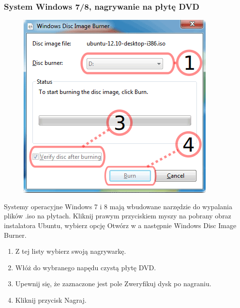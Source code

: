 \subsubsection{System Windows 7/8, nagrywanie na płytę DVD}
\begin{figure}
	\vspace{-10pt}
	\includegraphics[width=\linewidth]{images/instalacja_nagrywanie_obrazu_DVD.png}
\end{figure}

Systemy operacyjne Windows 7 i 8 mają wbudowane narzędzie do wypalania plików .iso na płytach. Kliknij prawym przyciskiem myszy na pobrany obraz instalatora Ubuntu, wybierz opcję \textcolor{ubuntu_orange}{Otwórz w} a następnie \textcolor{ubuntu_orange}{Windows Disc Image Burner}.
\begin{enumerate}[label=\protect\circled{\arabic*}]
\item Z tej listy wybierz swoją nagrywarkę.
\item Włóż do wybranego napędu czystą płytę DVD.
\item Upewnij się, że zaznaczone jest pole \textcolor{ubuntu_orange}{Zweryfikuj dysk po nagraniu}.
\item Kliknij przycisk \textcolor{ubuntu_orange}{Nagraj}.
\end{enumerate}

